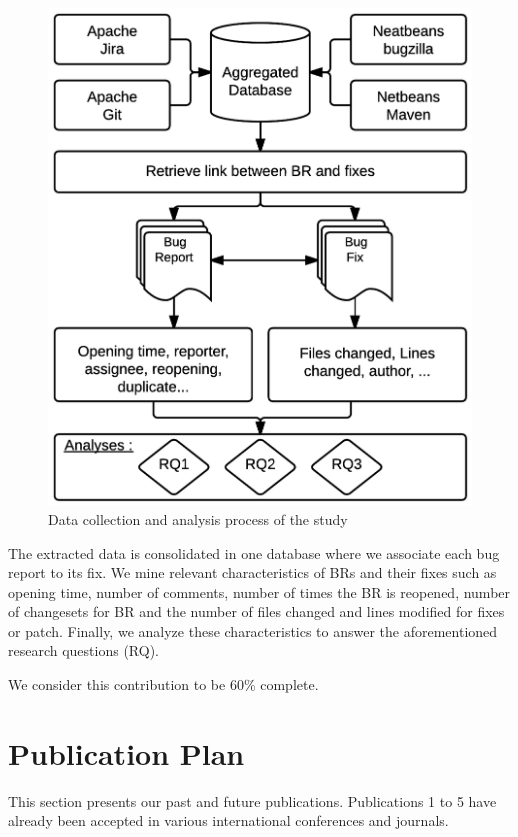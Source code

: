 \begin{figure}[h!]
  \centering
    \includegraphics{media/bug-taxo-flow.png}
    \caption{Data collection and analysis process of the study
    \label{fig:bug-taxo-flow}}
\end{figure}


The extracted data is
consolidated in one database where we associate each bug
report to its fix. We mine relevant characteristics of BRs and
their fixes such as opening time, number of comments,
number of times the BR is reopened, number of changesets
for BR and the number of files changed and lines modified
for fixes or patch. Finally, we analyze these characteristics to
answer the aforementioned research questions (RQ).

We consider this contribution to be 60\% complete.

\section{Publication Plan\label{sec:publication-plan}}

This section presents our past and future publications.
Publications 1 to 5 have already been accepted in various international conferences and journals.

